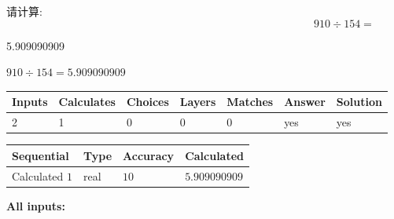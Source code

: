 \documentclass{ctexart}
\begin{document}
  
 
请计算:
\begin{equation}
910  \div    %
154 = \nonumber
\end{equation}
 
 
 
\noindent{}
 
 

5.909090909
 
 
\noindent{}
 
 

 
 
 
\noindent{}
 
 

$ %
910 \div  %
154=   %
5.909090909$
 
 
\noindent{}
 
 

 
   
   
   
   
\noindent\begin{tabular}{|l|l|l|l|l|l|l|}
 \hline
Inputs & Calculates & Choices & Layers & Matches & Answer & Solution \\ \hline
 2  & 
 1  & 
 0
  & 
 0  & 
 0  & 
  yes & 
  yes 
  \\ \hline
 \end{tabular}
   
   
   
   
\noindent{}
   
   
  
  
\noindent\begin{tabular}{|l|l|l|l|}
\hline
 Sequential & Type & Accuracy & Calculated \\ 
\hline
 
 
  Calculated $  1 $ & real & $  10  $ & 
 $ 5.909090909 $ 
 \\  \hline  
 \end{tabular}
   
   
   
   
\noindent\vspace{0.1in}\hspace{-0.08in} {\textbf{\Large{All inputs: }}}
   
\end{document}
